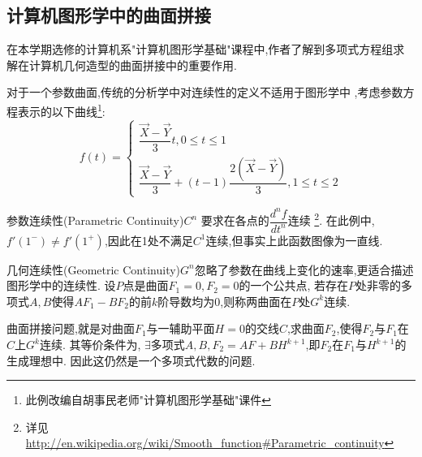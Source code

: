 \subsection{计算机图形学中的曲面拼接}
	在本学期选修的计算机系"计算机图形学基础"课程中,作者了解到多项式方程组求解在计算机几何造型的曲面拼接中的重要作用.

	对于一个参数曲面,传统的分析学中对连续性的定义不适用于图形学中
	,考虑参数方程表示的以下曲线\footnote{此例改编自胡事民老师"计算机图形学基础"课件}:
	\[  f(t) = \begin{cases} \dfrac{\overrightarrow X - \overrightarrow Y}{3}t,0\le t \le 1 \\
		\dfrac{\overrightarrow X - \overrightarrow Y}{3} + (t-1)\dfrac{2(\overrightarrow X - \overrightarrow Y)}{3},1 \le t \le 2
	\end{cases}\]

	参数连续性(Parametric Continuity)$ C^n $ 要求在各点的$ \dfrac{d^n f}{dt^n}$连续
	\footnote{详见\url{http://en.wikipedia.org/wiki/Smooth_function\#Parametric_continuity}}.
	在此例中,$ f'(1^-) \ne f'(1^+)$,因此在1处不满足$ C^1$连续,但事实上此函数图像为一直线.

	几何连续性(Geometric Continuity)$ G^n$忽略了参数在曲线上变化的速率,更适合描述图形学中的连续性.
	设$ P$点是曲面$ F_1 = 0, F_2 = 0$的一个公共点,
	若存在$ P$处非零的多项式$ A,B$使得$ AF_1-BF_2$的前$ k$阶导数均为0,则称两曲面在$ P$处$ G^k$连续.

	曲面拼接问题,就是对曲面$ F_1$与一辅助平面$ H=0$的交线$ C$,求曲面$ F_2$,使得$ F_2$与$ F_1$在$ C$上$ G^k$连续.
	其等价条件为, $ \exists \texttt{多项式}A,B,F_2 = AF + BH^{k+1}$,即$ F_2$在$ F_1$与$ H^{k+1}$的生成理想中\cite{warren}.
	因此这仍然是一个多项式代数的问题.
